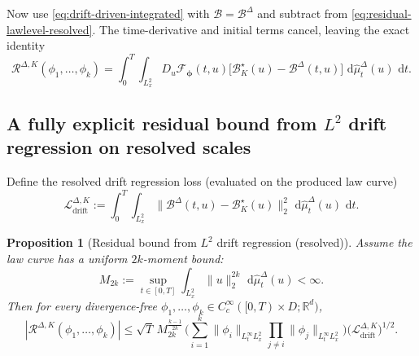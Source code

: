 \documentclass{article}
\numberwithin{equation}{section}
\theoremstyle{plain}
\newtheorem{proposition}[theorem]{Proposition}
\theoremstyle{definition}
\theoremstyle{remark}
\newcommand{\R}{\mathbb{R}}
\newcommand{\dd}{\,\mathrm{d}}
\newcommand{\abs}[1]{\left\lvert #1 \right\rvert}
\begin{document}
Now use \eqref{eq:drift-driven-integrated} with $\mathcal B=\mathcal B^\Delta$ and subtract from
\eqref{eq:residual-lawlevel-resolved}. The time-derivative and initial terms cancel, leaving the exact identity
\begin{equation}\label{eq:residual-as-drift-defect-resolved}
\mathcal R^{\Delta,K}(\phi_1,\dots,\phi_k)
=
\int_0^T\int_{L^2_x} D_u\mathcal F_{\boldsymbol\phi}(t,u)\big[\mathcal B^\star_K(u)-\mathcal B^\Delta(t,u)\big]\,
\dd\widehat\mu^\Delta_t(u)\,\dd t.
\end{equation}

\subsection{A fully explicit residual bound from $L^2$ drift regression on resolved scales}

Define the resolved drift regression loss (evaluated on the produced law curve)
\begin{equation}\label{eq:Ldrift-on-mu-resolved}
\mathcal L_{\mathrm{drift}}^{\Delta,K}
:=
\int_0^T\int_{L^2_x}\|\mathcal B^\Delta(t,u)-\mathcal B^\star_K(u)\|_2^2\,\dd\widehat\mu^\Delta_t(u)\,\dd t.
\end{equation}

\begin{proposition}[Residual bound from $L^2$ drift regression (resolved)]
\label{prop:residual-reg}
Assume the law curve has a uniform $2k$-moment bound:
\begin{equation}\label{eq:moment-2k}
M_{2k}:=\sup_{t\in[0,T]}\int_{L^2_x}\|u\|_2^{2k}\,\dd\widehat\mu^\Delta_t(u)<\infty.
\end{equation}
Then for every divergence-free $\phi_1,\dots,\phi_k\in C_c^\infty([0,T)\times D;\R^d)$,
\begin{equation}\label{eq:residual-bound-final}
\abs{\mathcal R^{\Delta,K}(\phi_1,\dots,\phi_k)}
\le
\sqrt{T}\,M_{2k}^{\frac{k-1}{2k}}\,
\Bigg(\sum_{i=1}^k \|\phi_i\|_{L^\infty_tL^2_x}\prod_{j\ne i}\|\phi_j\|_{L^\infty_tL^2_x}\Bigg)
\big(\mathcal L_{\mathrm{drift}}^{\Delta,K}\big)^{1/2}.
\end{equation}
\end{proposition}
\end{document}
